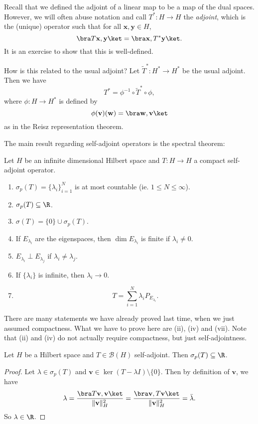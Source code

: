 \documentclass[a4paper]{article}
\begin{document}
Recall that we defined the adjoint of a linear map to be a map of the dual spaces. However, we will often abuse notation and call $T^*: H \to H$ the \emph{adjoint}, which is the (unique) operator such that for all $\mathbf{x}, \mathbf{y} \in H$,
\[
  \bra T \mathbf{x}, \mathbf{y}\ket = \bra \mathbf{x}, T^* \mathbf{y}\ket.
\]
It is an exercise to show that this is well-defined.

How is this related to the usual adjoint? Let $\tilde{T}^*: H^* \to H^*$ be the usual adjoint. Then we have
\[
  T^* = \phi^{-1} \circ \tilde{T}^* \circ \phi,
\]
where $\phi: H \to H^*$ is defined by
\[
  \phi(\mathbf{v})(\mathbf{w}) = \bra \mathbf{w}, \mathbf{v}\ket
\]
as in the Reisz representation theorem.

The main result regarding self-adjoint operators is the spectral theorem:
\begin{thm}
  Let $H$ be an infinite dimensional Hilbert space and $T: H \to H$ a compact self-adjoint operator.
  \begin{enumerate}
    \item $\sigma_p(T) = \{\lambda_i\}_{i = 1}^N$ is at most countable (ie. $1 \leq N \leq \infty$).
    \item $\sigma_p(T) \subseteq \R$.
    \item $\sigma(T) = \{0\} \cup \sigma_p(T)$.
    \item If $E_{\lambda_i}$ are the eigenspaces, then $\dim E_{\lambda_i}$ is finite if $\lambda_i \not= 0$.
    \item $E_{\lambda_i} \perp E_{\lambda_j}$ if $\lambda_i \not= \lambda_j$.
    \item If $\{\lambda_i\}$ is infinite, then $\lambda_i \to 0$.
    \item
      \[
        T = \sum_{i = 1}^N \lambda_i P_{E_{\lambda_i}}.
      \]
  \end{enumerate}
\end{thm}
There are many statements we have already proved last time, when we just assumed compactness. What we have to prove here are (ii), (iv) and (vii). Note that (ii) and (iv) do not actually require compactness, but just self-adjointness.

\begin{prop}
  Let $H$ be a Hilbert space and $T \in \mathcal{B}(H)$ self-adjoint. Then $\sigma_p(T) \subseteq \R$.
\end{prop}

\begin{proof}
  Let $\lambda \in \sigma_p(T)$ and $\mathbf{v} \in \ker(T - \lambda I) \setminus \{0\}$. Then by definition of $\mathbf{v}$, we have
  \[
    \lambda = \frac{\bra T \mathbf{v}, \mathbf{v}\ket}{\|\mathbf{v}\|^2_H} = \frac{\bra \mathbf{v}, T \mathbf{v}\ket}{\|\mathbf{v}\|^2_H} = \bar{\lambda}.
  \]
  So $\lambda \in \R$.
\end{proof}
\end{document}
